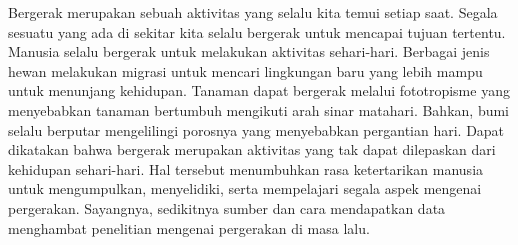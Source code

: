 \documentclass[a4paper,twoside]{article}
\begin{document}
Bergerak merupakan sebuah aktivitas yang selalu kita temui setiap saat. Segala sesuatu yang ada di sekitar kita selalu bergerak untuk mencapai tujuan tertentu. Manusia selalu bergerak untuk melakukan aktivitas sehari-hari. Berbagai jenis hewan melakukan migrasi untuk mencari lingkungan baru yang lebih mampu untuk menunjang kehidupan. Tanaman dapat bergerak melalui fototropisme yang menyebabkan tanaman bertumbuh mengikuti arah sinar matahari. Bahkan, bumi selalu berputar mengelilingi porosnya yang menyebabkan pergantian hari. Dapat dikatakan bahwa bergerak merupakan aktivitas yang tak dapat dilepaskan dari kehidupan sehari-hari. Hal tersebut menumbuhkan rasa ketertarikan manusia untuk mengumpulkan, menyelidiki, serta mempelajari segala aspek mengenai pergerakan. Sayangnya, sedikitnya sumber dan cara mendapatkan data menghambat penelitian mengenai pergerakan di masa lalu.

\iffalse

\begin{figure}[h]
    \centering
    \begin{subfigure}[b]{0.45\textwidth}
        \texttt{[image: Gambar/bab1:manusia.jpg]}
        \caption{Manusia bergerak untuk memenuhi kebutuhan sehari-hari}
        \label{bab1:manusia}
    \end{subfigure}
    \begin{subfigure}[b]{0.45\textwidth}
        \texttt{[image: Gambar/bab1:sunflower.jpg]}
        \caption{Bunga matahari bertumbuh mengikuti arah sinar matahari}
        \label{bab1:sunflower}
    \end{subfigure}
    \caption[Aktivitas pergerakan]{
    Aktivitas pergerakan yang dilakukan oleh berbagai entitas di sekitar kita}
    \label{bab1:pergerakan}
\end{figure}

\addtocounter{footnote}{-2} %

\stepcounter{footnote}\footnotetext{Alvin Mamudov, 2017, diakses pada tanggal 4 Januari 2021, \url{https://unsplash.com/photos/FlLHbmF3AHc}.}

\stepcounter{footnote}\footnotetext{Lisa Pellegrini, 2016, diakses pada tanggal 4 Januari 2021, \url{https://unsplash.com/photos/XCvy_eufErI}.}

\fi
\end{document}
